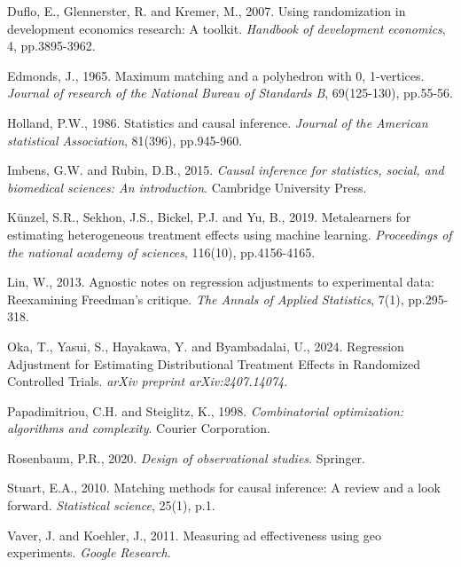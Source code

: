 \documentclass[final,3p,fleqn, 10pt]{elsarticle}
\begin{document}
\begin{thebibliography}{99}
Duflo, E., Glennerster, R. and Kremer, M., 2007. Using randomization in development economics research: A toolkit. \textit{Handbook of development economics}, 4, pp.3895-3962.

Edmonds, J., 1965. Maximum matching and a polyhedron with 0, 1-vertices. \textit{Journal of research of the National Bureau of Standards B}, 69(125-130), pp.55-56.

Holland, P.W., 1986. Statistics and causal inference. \textit{Journal of the American statistical Association}, 81(396), pp.945-960.

Imbens, G.W. and Rubin, D.B., 2015. \textit{Causal inference for statistics, social, and biomedical sciences: An introduction}. Cambridge University Press.

K\"{u}nzel, S.R., Sekhon, J.S., Bickel, P.J. and Yu, B., 2019. Metalearners for estimating heterogeneous treatment effects using machine learning. \textit{Proceedings of the national academy of sciences}, 116(10), pp.4156-4165.

Lin, W., 2013. Agnostic notes on regression adjustments to experimental data: Reexamining Freedman's critique. \textit{The Annals of Applied Statistics}, 7(1), pp.295-318.

Oka, T., Yasui, S., Hayakawa, Y. and Byambadalai, U., 2024. Regression Adjustment for Estimating Distributional Treatment Effects in Randomized Controlled Trials. \textit{arXiv preprint arXiv:2407.14074}.

Papadimitriou, C.H. and Steiglitz, K., 1998. \textit{Combinatorial optimization: algorithms and complexity}. Courier Corporation.

Rosenbaum, P.R., 2020. \textit{Design of observational studies}. Springer.

Stuart, E.A., 2010. Matching methods for causal inference: A review and a look forward. \textit{Statistical science}, 25(1), p.1.

Vaver, J. and Koehler, J., 2011. Measuring ad effectiveness using geo experiments. \textit{Google Research}.


\end{thebibliography}
\end{document}

